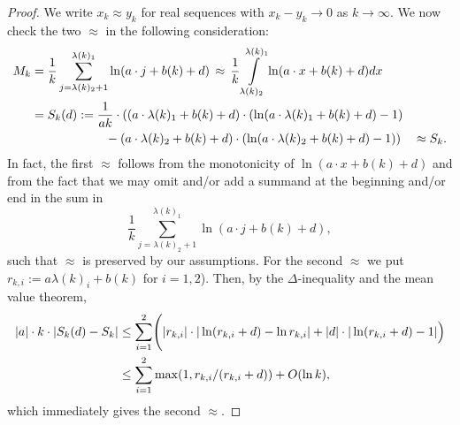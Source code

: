 \documentclass[reqno]{amsart}
\theoremstyle{plain}
\theoremstyle{definition}
\numberwithin{equation}{section}
\newcommand{\ra}{\rightarrow}
\begin{document}
\begin{proof}
We write $x_k \approx y_k$ for  real sequences with  $x_k - y_k \ra 0$ as $k \to \infty$.
We now check the two $\approx $ in the following consideration:
\begin{align}
M_k
&=
\frac{1}{k}  \sum\limits_{j=\lambda(k)_2+1}^{\lambda(k)_1} \ln(a \cdot j +b(k)+d)
\>\>{\approx}\>\>
\frac{1}{k} \int\limits_{\lambda(k)_2}^{\lambda(k)_1} \ln(a \cdot x +b(k)+d)dx \notag\\
&= S_k(d):=
\frac{1}{a k} \cdot ((a \cdot \lambda(k)_1 + b(k) + d) \cdot (\ln(a \cdot \lambda(k)_1 + b(k) + d) - 1)
\notag\\ &\quad\quad\quad\quad\quad\quad  - (a \cdot \lambda(k)_2 + b(k) + d) \cdot (\ln(a \cdot \lambda(k)_2+b(k)+d)-1)) \quad
\approx S_k.\notag
\end{align} 
In fact, the first $\approx $ follows  from the monotonicity of $ \ln(a \cdot x +b(k)+d)$ and from the fact that we may 
 omit and/or add a summand at the beginning and/or end
in the sum in
$$ \frac{1}{k}\sum\limits_{j=\lambda(k)_2+1}^{\lambda(k)_1} \ln(a \cdot j +b(k)+d),$$
such that $\approx$ is preserved by our assumptions.
For the second $\approx$ we put
$r_{k,i}:=a  \lambda(k)_i+b(k)$ for  $i=1,2$).
Then, by the $\Delta$-inequality and the mean value theorem,
\begin{align}
  |a|\cdot k\cdot|S_k(d)-S_k| &\le \sum_{i=1}^2 \Biggl( |r_{k,i}|\cdot |\ln(r_{k,i}+d)-\ln r_{k,i}| + |d|\cdot |\ln(r_{k,i}+d)-1|\Bigr) \notag\\
  &\le \sum_{i=1}^2\max(1, r_{k,i}/(r_{k,i}+d)) +O(\ln k),\notag
\end{align}
which immediately gives the second  $\approx$.
\end{proof}
\end{document}
